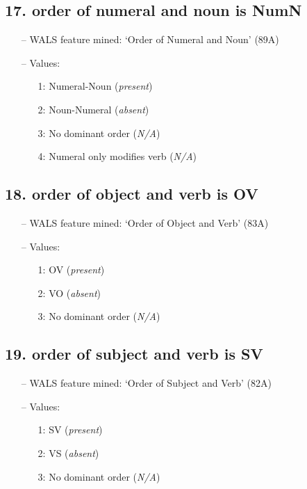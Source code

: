 \subsection*{17. order of numeral and noun is NumN}

\begin{itemize}
\item[--] WALS feature mined: `Order of Numeral and Noun' (89A)
\item[--] Values:

\begin{enumerate}
\item[1:] Numeral-Noun (\emph{present})
\item[2:] Noun-Numeral (\emph{absent})
\item[3:] No dominant order (\emph{N/A})
\item[4:] Numeral only modifies verb (\emph{N/A})
\end{enumerate}
\end{itemize}

\subsection*{18. order of object and verb is OV}

\begin{itemize}
\item[--] WALS feature mined: `Order of Object and Verb' (83A)
\item[--] Values:

\begin{enumerate}
\item[1:] OV (\emph{present})
\item[2:] VO (\emph{absent})
\item[3:] No dominant order (\emph{N/A})
\end{enumerate}
\end{itemize}

\subsection*{19. order of subject and verb is SV}

\begin{itemize}
\item[--] WALS feature mined: `Order of Subject and Verb' (82A)
\item[--] Values:

\begin{enumerate}
\item[1:] SV (\emph{present})
\item[2:] VS (\emph{absent})
\item[3:] No dominant order (\emph{N/A})
\end{enumerate}
\end{itemize}

